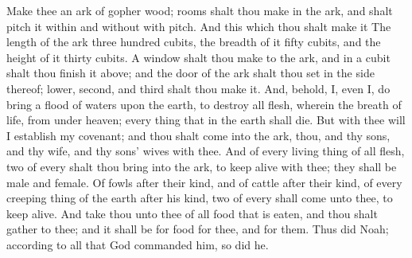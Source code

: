 {Make thee an
ark of
gopher
wood;
rooms shalt thou
make
in the
ark, and shalt
pitch it
within and
without with
pitch.
And this
{} which thou shalt
make it
{} The
length of the
ark
{}
three
hundred
cubits, the
breadth of it
fifty
cubits, and the
height of it
thirty
cubits.
A
window shalt thou
make to the
ark, and in a
cubit shalt thou
finish it
above; and the
door of the
ark shalt thou
set in the side
thereof;
{}
lower,
second, and
third
{} shalt thou
make it.
And,
behold,
I, even I, do
bring a
flood of
waters upon the
earth, to
destroy all
flesh, wherein
{} the
breath of
life, from
under
heaven;
{} every
thing that
{} in the
earth shall
die.
But with thee will I
establish my
covenant; and thou shalt
come
into the
ark,
thou, and thy
sons, and thy
wife, and thy
sons’
wives with thee.
And of every living
thing of all
flesh,
two of every
{} shalt thou
bring into the
ark, to keep
{}
alive with thee; they shall be
male and
female.
Of
fowls after their
kind, and of
cattle after their
kind, of every creeping
thing of the
earth after his
kind,
two of every
{} shall
come unto thee, to keep
{}
alive.
And
take thou unto thee of all
food that is
eaten, and thou shalt
gather
{} to thee; and it shall be for
food for thee, and for them.
Thus
did
Noah; according to all that
God
commanded him, so
did he.

}

